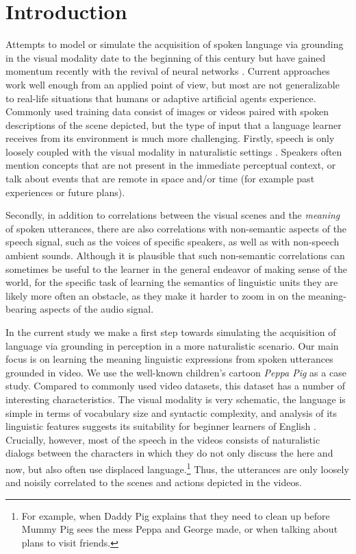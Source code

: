 \section{Introduction}
\label{sec:intro}

Attempts to model or simulate the acquisition of spoken language via
grounding in the visual modality date to the beginning of this century
\citep{roypentland2002learning} but have gained momentum recently
with the revival of neural networks
\citep[e.g.][]{synnaeve2014learning,harwath2015deep,
  harwath2016unsupervised,chrupala-etal-2017-representations,alishahi-etal-2017-encoding,harwath2018jointly,Merkx2019,havard2019models,rouditchenko2020avlnet,khorrami_2021,peng2021fastslow}.
Current approaches work well enough from an applied point of view, 
but most are not generalizable to real-life situations that humans or 
adaptive artificial agents experience. Commonly used training data
consist of images or videos paired with spoken descriptions
of the scene depicted, but the type of input that a language learner receives 
from its environment is much more challenging.  
Firstly, speech is only loosely coupled with the visual modality in naturalistic settings
 \citep{matusevych2013automatic, beekhuizen2013word}. Speakers often mention 
 concepts that are not present in the immediate perceptual context, 
 or talk about events that are remote in space and/or time (for
 example past experiences or future plans).
 
Secondly, in addition to
correlations between the visual scenes and the {\it meaning} of spoken
utterances, there are also correlations with non-semantic aspects of
the speech signal, such as the voices of specific speakers, as well
as with non-speech ambient sounds. Although it is plausible that such
non-semantic correlations can sometimes be useful to the learner in
the general endeavor of making sense of the world, for the specific
task of learning the semantics of linguistic units they are likely more
often an obstacle, as they make it harder to zoom in on the
meaning-bearing aspects of the audio signal.

In the current study we make a first step towards simulating the
acquisition of language via grounding in perception in a more
naturalistic scenario.  Our main focus is on learning the meaning
linguistic expressions from spoken utterances grounded in video.  We
use the well-known children's cartoon {\it Peppa Pig} as a case
study. Compared to commonly used video datasets, this dataset has a
number of interesting characteristics.  The visual modality is very
schematic, the language is simple in terms of vocabulary size and
syntactic complexity, and analysis of its linguistic features suggests
its suitability for beginner learners of English
\cite{kokla2021peppa,scheffler2021peppa}.  Crucially, however, most of
the speech in the videos consists of naturalistic dialogs between the
characters in which they do not only discuss the here and now, but
also often use displaced language.\footnote{For example, when Daddy
  Pig explains that they need to clean up before Mummy Pig sees the mess
  Peppa and George made, or when talking about plans to visit
  friends.}  Thus, the utterances are only loosely and noisily
correlated to the scenes and actions depicted in the videos.


